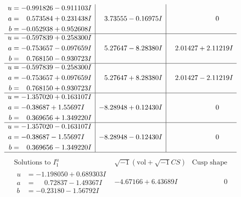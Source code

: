 \documentclass[1p]{elsarticle_modified}
\theoremstyle{definition}
\newcommand{\I}{\sqrt{-1}}
\begin{document}
$$\begin{array}{c|c|c}
\begin{aligned}
u &= -0.991826 - 0.911103 I \\
a &= \phantom{-}0.573584 + 0.231438 I \\
b &= -0.052938 + 0.952608 I\end{aligned}
 & \phantom{-}3.73555 - 0.16975 I & \phantom{-0.000000 } 0 \\ \hline\begin{aligned}
u &= -0.597839 + 0.258300 I \\
a &= -0.753657 - 0.097659 I \\
b &= \phantom{-}0.768150 - 0.930723 I\end{aligned}
 & \phantom{-}5.27647 - 8.28380 I & \phantom{-}2.01427 + 2.11219 I \\ \hline\begin{aligned}
u &= -0.597839 - 0.258300 I \\
a &= -0.753657 + 0.097659 I \\
b &= \phantom{-}0.768150 + 0.930723 I\end{aligned}
 & \phantom{-}5.27647 + 8.28380 I & \phantom{-}2.01427 - 2.11219 I \\ \hline\begin{aligned}
u &= -1.357020 + 0.163107 I \\
a &= -0.38687 + 1.55697 I \\
b &= \phantom{-}0.369656 + 1.349220 I\end{aligned}
 & -8.28948 + 0.12430 I & \phantom{-0.000000 } 0 \\ \hline\begin{aligned}
u &= -1.357020 - 0.163107 I \\
a &= -0.38687 - 1.55697 I \\
b &= \phantom{-}0.369656 - 1.349220 I\end{aligned}
 & -8.28948 - 0.12430 I & \phantom{-0.000000 } 0\\
 \hline 
 \end{array}$$\newpage$$\begin{array}{c|c|c}  
\text{Solutions to }I^u_{1}& \I (\text{vol} + \sqrt{-1}CS) & \text{Cusp shape}\\
 \hline 
\begin{aligned}
u &= -1.198050 + 0.689303 I \\
a &= \phantom{-}0.72837 - 1.49367 I \\
b &= -0.23180 - 1.56792 I\end{aligned}
 & -4.67166 + 6.43689 I & \phantom{-0.000000 } 0 \\ \hline\begin{aligned}

\end{aligned}
\end{array}$$
\end{document}
